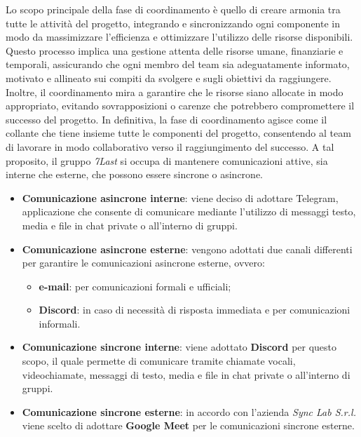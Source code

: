 Lo scopo principale della fase di coordinamento è quello di creare armonia tra tutte le attività del progetto, integrando e sincronizzando ogni componente in modo da massimizzare l'efficienza e ottimizzare l'utilizzo delle risorse disponibili. Questo processo implica una gestione attenta delle risorse umane, finanziarie e temporali, assicurando che ogni membro del team sia adeguatamente informato, motivato e allineato sui compiti da svolgere e sugli obiettivi da raggiungere. Inoltre, il coordinamento mira a garantire che le risorse siano allocate in modo appropriato, evitando sovrapposizioni o carenze che potrebbero compromettere il successo del progetto. In definitiva, la fase di coordinamento agisce come il collante che tiene insieme tutte le componenti del progetto, consentendo al team di lavorare in modo collaborativo verso il raggiungimento del successo. A tal proposito, il gruppo \textit{7Last} si occupa di mantenere comunicazioni attive, sia interne che esterne, che possono essere sincrone o asincrone.
\begin{itemize}
    \item \textbf{Comunicazione asincrone interne}: viene deciso di adottare Telegram, applicazione che consente di comunicare mediante l'utilizzo di messaggi testo, media e file in chat private o all'interno di gruppi.
    \item \textbf{Comunicazione asincrone esterne}: vengono adottati due canali differenti per garantire le comunicazioni asincrone esterne, ovvero: 
        \begin{itemize}
            \item \textbf{e-mail}: per comunicazioni formali e ufficiali;
            \item \textbf{Discord}: in caso di necessità di risposta immediata e per comunicazioni informali.
        \end{itemize}
\end{itemize}
\begin{itemize}
    \item \textbf{Comunicazione sincrone interne}: viene adottato \textbf{Discord} per questo scopo, il quale permette di comunicare tramite chiamate vocali, videochiamate, messaggi di testo, media e file in chat private o all'interno di gruppi.
    \item \textbf{Comunicazione sincrone esterne}: in accordo con l'azienda \textit{Sync Lab S.r.l.} viene scelto di adottare \textbf{Google Meet} per le comunicazioni sincrone esterne.
\end{itemize}

